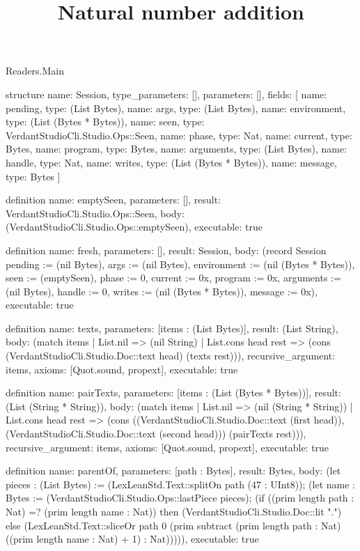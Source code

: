 \begin{lexlean}{Readers.Main}
\title{Natural number addition}
\begin{semanticmodule}
structure{
  name: Session,
  type_parameters: [],
  parameters: [],
  fields: [
    {name: pending, type: (List Bytes)},
    {name: args, type: (List Bytes)},
    {name: environment, type: (List (Bytes * Bytes))},
    {name: seen, type: VerdantStudioCli.Studio.Ops::Seen},
    {name: phase, type: Nat},
    {name: current, type: Bytes},
    {name: program, type: Bytes},
    {name: arguments, type: (List Bytes)},
    {name: handle, type: Nat},
    {name: writes, type: (List (Bytes * Bytes))},
    {name: message, type: Bytes}
  ]
}

definition{
  name: emptySeen,
  parameters: [],
  result: VerdantStudioCli.Studio.Ops::Seen,
  body: (VerdantStudioCli.Studio.Ops::emptySeen),
  executable: true
}

definition{
  name: fresh,
  parameters: [],
  result: Session,
  body: (record Session {pending := (nil Bytes), args := (nil Bytes), environment := (nil (Bytes * Bytes)), seen := (emptySeen), phase := 0, current := 0x, program := 0x, arguments := (nil Bytes), handle := 0, writes := (nil (Bytes * Bytes)), message := 0x}),
  executable: true
}

definition{
  name: texts,
  parameters: [items : (List Bytes)],
  result: (List String),
  body: (match items
    | List.nil => (nil String)
    | List.cons head rest => (cons (VerdantStudioCli.Studio.Doc::text head) (texts rest))),
  recursive_argument: items,
  axioms: [Quot.sound, propext],
  executable: true
}

definition{
  name: pairTexts,
  parameters: [items : (List (Bytes * Bytes))],
  result: (List (String * String)),
  body: (match items
    | List.nil => (nil (String * String))
    | List.cons head rest => (cons ((VerdantStudioCli.Studio.Doc::text (first head)), (VerdantStudioCli.Studio.Doc::text (second head))) (pairTexts rest))),
  recursive_argument: items,
  axioms: [Quot.sound, propext],
  executable: true
}

definition{
  name: parentOf,
  parameters: [path : Bytes],
  result: Bytes,
  body: (let pieces : (List Bytes) := (LexLeanStd.Text::splitOn path (47 : UInt8)); (let name : Bytes := (VerdantStudioCli.Studio.Ops::lastPiece pieces); (if ((prim length path : Nat) =? (prim length name : Nat)) then (VerdantStudioCli.Studio.Doc::lit ".") else (LexLeanStd.Text::sliceOr path 0 (prim subtract (prim length path : Nat) ((prim length name : Nat) + 1) : Nat))))),
  executable: true
}


\end{semanticmodule}
\end{lexlean}
